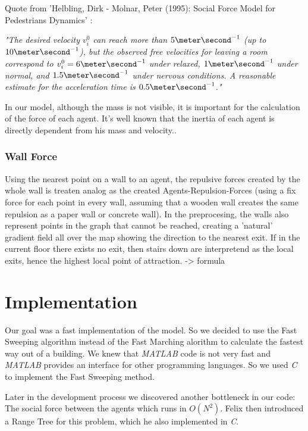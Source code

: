 \documentclass[11pt]{article}
\begin{document}
Quote from 'Helbling, Dirk - Molnar, Peter (1995): Social Force Model for Pedestrians Dynamics' \cite{SFMPD} :
\begin{center}
\textit{"The desired velocity $v^0_i$ can reach more than $5 \meter\second^{-1}$
(up to $10 \meter\second^{-1}$), but the observed free velocities for leaving a 
room correspond to $v^0_i=6 \meter\second^{-1}$ under relaxed, $1\meter\second^{-1}$
under normal, and $1.5\meter\second^{-1}$ under nervous conditions. A reasonable
estimate for the acceleration time is $0.5\meter\second^{-1}$."}
\end{center}
In our model, although the mass is not visible, it is important for
the calculation of the force of each agent. It's well known that the inertia of
each agent is directly dependent from his mass and velocity..

\subsubsection{Wall Force}

Using the nearest point on a wall to an agent, the repulsive forces created by
the whole wall is treaten analog as the created Agents-Repulsion-Forces (using a
fix force for each point in every wall, assuming that a wooden wall creates the
same repulsion as a paper wall or concrete wall). In the preprocesing, the walls
also represent points in the graph that cannot be reached, creating a 'natural'
gradient field all over the map showing the direction to the nearest exit. If in
the current floor there exists no exit, then stairs down are interpretend as the
local exits, hence the highest local point of attraction. \cite{SFMPD} 
-> formula




\section{Implementation}
Our goal was a fast implementation of the model. So we decided to use the Fast
Sweeping algorithm instead of the Fast Marching alorithm to calculate the
fastest way out of a building. We knew that \textit{MATLAB} code is not very fast and
\textit{MATLAB} provides an interface for other programming languages. So we
used \textit{C} to
implement the Fast Sweeping method.

Later in the development process we discovered another bottleneck in our code:
The social force between the agents which runs in $ O(N^2) $. Felix then
introduced a Range Tree for this problem, which he also implemented in
\textit{C}.
\end{document}
